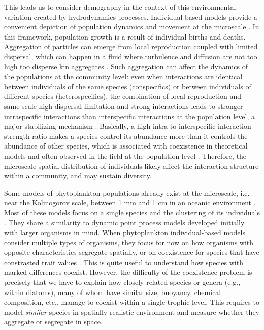 \documentclass[english]{article}
\begin{document}
This leads us to consider demography in the context of this environmental
variation created by hydrodynamics processes. Individual-based models
provide a convenient depiction of population dynamics and movement
at the microscale \citep{hellweger_bunch_2009}. In this framework,
population growth is a result of individual births and deaths. Aggregation
of particles can emerge from local reproduction coupled with limited
dispersal, which can happen in a fluid where turbulence and diffusion
are not too high too disperse kin aggregates \citep{young_reproductive_2001}.
Such aggregation can affect the dynamics of the populations at the
community level: even when interactions are identical between individuals
of the same species (conspecifics) or between individuals of different
species (heterospecifics), the combination of local reproduction and
same-scale high dispersal limitation and strong interactions leads
to stronger intraspecific interactions than interspecific interactions
at the population level, a major stabilizing mechanism \citep{detto_stabilization_2016}.
Basically, a high intra-to-interspecific interaction strength ratio
makes a species control its abundance more than it controls the abundance
of other species, which is associated with coexistence in theoretical
models \citep{levine_importance_2009,barabas_self-regulation_2017}
and often observed in the field at the population level \citep{adler_competition_2018,picoche_strong_2020}.
Therefore, the microscale spatial distribution of individuals likely
affect the interaction structure within a community, and may sustain
diversity.

Some models of phytoplankton populations already exist at the microscale,
i.e. near the Kolmogorov scale, between 1 mm and 1 cm in an oceanic
environment \citep{barton_impact_2014}. Most of these models focus
on a single species and the clustering of its individuals \citep{young_reproductive_2001,birch_bounding_2007,bouderbala_3d_2018,breier_emergence_2018}.
They share a similarity to dynamic point process models \citep{law_population_2003,bolker_spatial_1999,plank_spatial_2015}
developed initially with larger organisms in mind. When phytoplankton
individual-based models consider multiple types of organisms, they
focus for now on how organisms with opposite characteristics \citep[e.g., increase vs decrease in density with turbulence in][]{borgnino_turbulence_2019,arrieta_fate_2020}
segregate spatially, or on coexistence for species that have constrasted
trait values \citep[e.g., size in][]{benczik_coexistence_2006}. This
is quite useful to understand how species with marked differences
coexist. However, the difficulty of the coexistence problem is precisely
that we have to explain how closely related species or genera (e.g.,
within diatoms), many of whom have similar size, buoyancy, chemical
composition, etc., manage to coexist within a single trophic level.
This requires to model \emph{similar} species in spatially realistic
environment and measure whether they aggregate or segregate in space.
\end{document}

